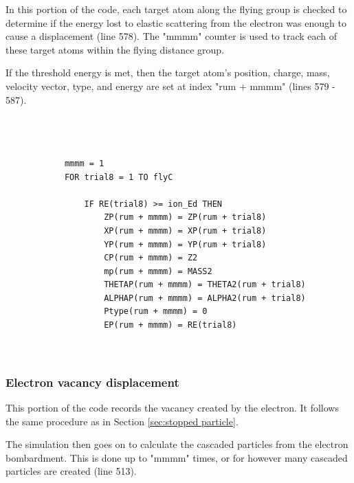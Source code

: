 \documentclass[10pt, reqno]{exam}
\begin{document}
In this portion of the code, each target atom along the flying group is checked to determine if the energy lost to elastic scattering from the electron was enough to cause a displacement (line 578). The "mmmm" counter is used to track each of these target atoms within the flying distance group. \par

\vspace{0.5 cm}

If the threshold energy is met, then the target atom's position, charge, mass, velocity vector, type, and energy are set at index "rum + mmmm" (lines 579 - 587). \par

\begin{verbatim}
    
    
    
            mmmm = 1
            FOR trial8 = 1 TO flyC
    
                IF RE(trial8) >= ion_Ed THEN
                    ZP(rum + mmmm) = ZP(rum + trial8)
                    XP(rum + mmmm) = XP(rum + trial8)
                    YP(rum + mmmm) = YP(rum + trial8)
                    CP(rum + mmmm) = Z2
                    mp(rum + mmmm) = MASS2
                    THETAP(rum + mmmm) = THETA2(rum + trial8)
                    ALPHAP(rum + mmmm) = ALPHA2(rum + trial8)
                    Ptype(rum + mmmm) = 0
                    EP(rum + mmmm) = RE(trial8)
    
    
\end{verbatim}

\subsubsection{Electron vacancy displacement}

This portion of the code records the vacancy created by the electron. It follows the same procedure as in Section \ref{sec:stopped particle}. \par

The simulation then goes on to calculate the cascaded particles from the electron bombardment. This is done up to "mmmm" times, or for however many cascaded particles are created (line 513). 
\end{document}
